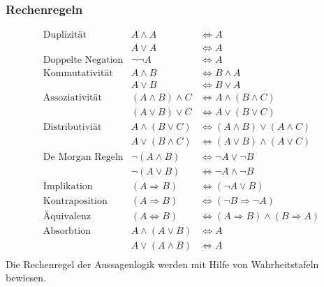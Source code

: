 \subsubsection{Rechenregeln}
\settowidth{\MyLenA}{Doppelte Negation~~}
\begin{equation*}
\begin{array}{lrl}
	\mbox{Duplizität}			& A \wedge A				& \Leftrightarrow A\\
								& A \vee A					& \Leftrightarrow A\\
	\mbox{Doppelte Negation}	& \neg\neg A 				& \Leftrightarrow A\\
	\mbox{Kommutativität}		& A \wedge B 				& \Leftrightarrow B \wedge A\\
								& A \vee B					& \Leftrightarrow B \vee A\\
	\mbox{Assoziativität} 		& (A \wedge B) \wedge C 	& \Leftrightarrow A \wedge (B \wedge C)\\
								& (A \vee B) \vee C 		& \Leftrightarrow A \vee (B \vee C)\\
	\mbox{Distributiviät}		& A \wedge (B \vee C) 		& \Leftrightarrow (A \wedge B) \vee (A \wedge C)\\
								& A \vee (B \wedge C) 		& \Leftrightarrow (A \vee B) \wedge (A \vee C)\\
	\mbox{De Morgan Regeln}		& \neg (A \wedge B) 		& \Leftrightarrow \neg A \vee \neg B\\
								& \neg (A \vee B) 			& \Leftrightarrow \neg A \wedge \neg B\\
	\mbox{Implikation}			& (A \Rightarrow B) 		& \Leftrightarrow (\neg A \vee B)\\
	\mbox{Kontraposition}		& (A \Rightarrow B) 		& \Leftrightarrow (\neg B \Rightarrow \neg A)\\
	\mbox{Äquivalenz}			& (A \Leftrightarrow B)		& \Leftrightarrow (A \Rightarrow B) \wedge (B \Rightarrow A)\\
	\mbox{Absorbtion}			& A \wedge (A \vee B)		& \Leftrightarrow A\\
								& A \vee (A \wedge B)		& \Leftrightarrow A\\
\end{array}
\end{equation*}
Die Rechenregel der Aussagenlogik werden mit Hilfe von Wahrheitstafeln bewiesen.


